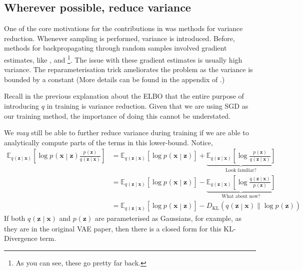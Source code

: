 \documentclass{article}
\newcommand{\prob}[3]{{#1}_{#2} \left( #3 \right)}
\newcommand{\condprob}[4]{{#1}_{#2} \left( #3 \middle| #4 \right)}
\newcommand{\expected}[2]{\mathbb{E}_{#1}\left[ #2 \right]}
\newcommand{\KL}[2]{D_{\mathrm{KL}}\left( #1 \| #2 \right)}
\newcommand{\x}{\mathbf{x}}
\newcommand{\z}{\mathbf{z}}
\begin{document}
\subsection{Wherever possible, reduce variance}
One of the core motivations for the contributions in \cite{kingma2013auto} was methods for variance reduction. Whenever sampling is performed, variance is introduced. Before, methods for backpropagating through random samples involved gradient estimates, like \cite{williams1988use}, \cite{bonnet1964transformations} and \cite{price1958useful} \footnote{As you can see, these go pretty far back.}. The issue with these gradient estimates is usually high variance. The reparameterisation trick ameliorates the problem as the variance is bounded by a constant (More details can be found in the appendix of \cite{rezende2014stochastic}.)

Recall in the previous explanation about the ELBO that the entire purpose of introducing $q$ in training is variance reduction. 
Given that we are using SGD as our training method,
the importance of doing this cannot be understated.

We \emph{may} still be able to further reduce variance during training if we are able to analytically compute parts of the terms in this lower-bound. Notice, 
\begin{align*}
\expected{\condprob{q}{}{\z}{\x}}{\log
\condprob{p}{}{\x}{\z} \frac{\prob{p}{}{\z}}{\condprob{q}{}{\z}{\x}}} 
&= \expected{\condprob{q}{}{\z}{\x}}{\log \condprob{p}{}{\x}{\z}} + 
\underbrace{\expected{\condprob{q}{}{\z}{\x}}{\log \frac{\prob{p}{}{\z}}{\condprob{q}{}{\z}{\x}}}}_{\text{Look familiar?}} \\
&= \expected{\condprob{q}{}{\z}{\x}}{\log \condprob{p}{}{\x}{\z}} - 
\underbrace{\expected{\condprob{q}{}{\z}{\x}}{\log \frac{\condprob{q}{}{\z}{\x}}{\prob{p}{}{\z}}}}_{\text{What about now?}} \\
&= \expected{\condprob{q}{}{\z}{\x}}{\log \condprob{p}{}{\x}{\z}} - 
\KL{\condprob{q}{}{\z}{\x}}{\log \prob{p}{}{\z}}
\end{align*}
If both $\condprob{q}{}{\z}{\x}$ and $ \prob{p}{}{\z}$ are parameterised as Gaussians, for example, as they are in the original VAE paper, then there is a closed form for this KL-Divergence term.
\end{document}
